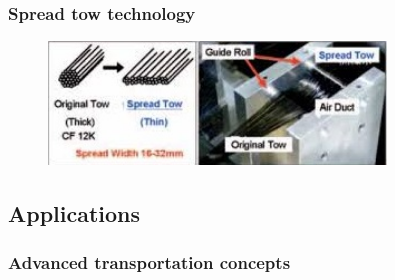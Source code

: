 \documentclass[first,firstsupp,lastsupp,handout,last,hyperref,table]{ETHclass}
\begin{document}
\begin{frame}
\frametitle{Spread tow technology}
\vspace{-.5cm}
\centering
\begin{figure}
\centering
\includegraphics[width=0.8\textwidth]{spread_tow_technology_scheme}
\label{fig:design_workflow}
\end{figure}
\end{frame}

\subsection{Applications}

\begin{frame}
\frametitle{Advanced transportation concepts}
\centering
\begin{figure}[!h]
\centering
{}\quad
{}
  \label{fig:transp1}
\end{figure}
\end{frame}
\end{document}
